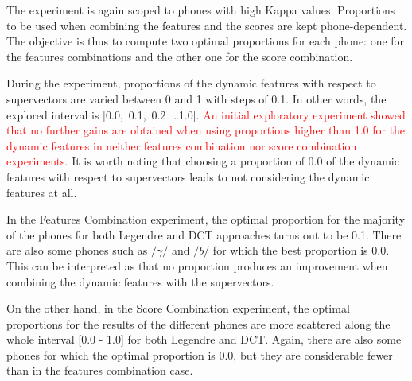The experiment is again scoped to phones with high Kappa values.
Proportions to be used when combining the features and the scores are kept phone-dependent.
The objective is thus to compute two optimal proportions for each phone:
one for the features combinations and the other one for the score combination.

During the experiment, proportions of the dynamic features with respect to supervectors
are varied between 0 and 1 with steps of 0.1.
In other words, the explored interval is
\mbox{[0.0, 0.1, 0.2 \ldots 1.0]}.
\textcolor{red}{
	An initial exploratory experiment showed that no further gains are obtained when using
	proportions higher than 1.0 for the dynamic features in neither features combination nor score combination
	experiments.
}
It is worth noting that choosing
a proportion of 0.0 of the dynamic
features with respect to supervectors leads to not considering the dynamic features at all.


In the Features Combination experiment,
the optimal proportion for the majority of the phones
for both Legendre and DCT approaches turns out to be 0.1.
There are also some phones such as
$/\gamma/$ and $/b/$ for which the best proportion is 0.0.
This can be interpreted as that
no proportion produces an improvement when combining the dynamic features with the supervectors.

On the other hand, in the Score Combination experiment, the optimal proportions for
the results of the different phones are more scattered along the whole interval [0.0 - 1.0]
for both Legendre and
DCT. Again, there are also some phones for which the optimal proportion is 0.0, but they are
considerable fewer than in the features combination case.

